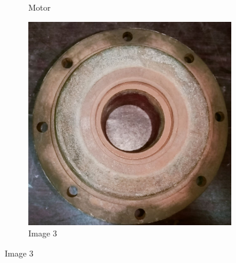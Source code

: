 \documentclass[12pt]{article}
\begin{document}
\begin{figure}
\begin{subfigure}{0.3\textwidth}
      \caption{Motor}
  \end{subfigure}
  \hfill
  \begin{subfigure}{0.3\textwidth}
      \includegraphics[width=\linewidth]{img/03.jpg}
      \caption{Image 3}
  \end{subfigure}

  \vspace{0.5cm}


\end{figure}
\end{document}
